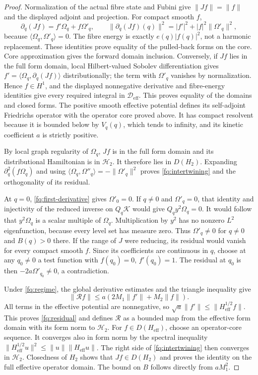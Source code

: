 \begin{proof}
Normalization of the actual fibre state and Fubini give
$\|Jf\|=\|f\|$ and the displayed adjoint and projection.
For compact smooth $f$,
\[
 \partial_q(Jf)=f'\Omega_q+f\Omega'_q,\qquad
 \|\partial_q(Jf)(q)\|^2=|f'|^2+|f|^2\|\Omega'_q\|^2,
\]
because $\langle\Omega_q,\Omega'_q\rangle=0$. The fibre energy
is exactly $e(q)|f(q)|^2$, not a harmonic replacement. These
identities prove equality of the pulled-back forms on the core.
Core approximation gives the forward domain inclusion. Conversely,
if $Jf$ lies in the full form domain, local Hilbert-valued Sobolev
differentiation gives
$f'=\langle\Omega_q,\partial_q(Jf)\rangle$ distributionally;
the term with $\Omega'_q$ vanishes by normalization. Hence $f\in H^1$,
and the displayed nonnegative derivative and fibre-energy identities
give every required integral in $\mathcal D_{\mathrm{eff}}$.
This proves equality of the domains and closed forms. The positive
smooth effective potential defines its self-adjoint Friedrichs
operator with the operator core proved above. It has compact
resolvent because it is bounded below by $V_q(q)$, which tends
to infinity, and its kinetic coefficient $a$ is strictly positive.

By local graph regularity of $\Omega_q$, $Jf$ is in the full form
domain and its distributional Hamiltonian is in $\mathscr H_2$.
It therefore lies in $D(H_2)$. Expanding $\partial_q^2(f\Omega_q)$
and using $\langle\Omega_q,\Omega''_q\rangle=-\|\Omega'_q\|^2$
proves \eqref{fq:intertwining} and the orthogonality of its residual.

At $q=0$, \eqref{fq:first-derivative} gives $\Omega'_0=0$.
If $q\ne0$ and $\Omega'_q=0$, that identity and injectivity of
the reduced inverse on $Q_q\mathscr K$ would give
$Q_qy^2\Omega_q=0$. It would follow that $y^2\Omega_q$ is a
scalar multiple of $\Omega_q$. Multiplication by $y^2$ has no
nonzero $L^2$ eigenfunction, because every level set has measure
zero. Thus $\Omega'_q\ne0$ for $q\ne0$ and $B(q)>0$ there.
If the range of $J$ were reducing, its residual would vanish for
every compact smooth $f$. Since its coefficients are continuous
in $q$, choose at any $q_0\ne0$ a test function with
$f(q_0)=0$, $f'(q_0)=1$. The residual at $q_0$ is then
$-2a\Omega'_{q_0}\ne0$, a contradiction.

Under \eqref{fq:regime}, the global derivative estimates and the
triangle inequality give
\[
 \|\mathcal Rf\|\leq a(2M_1\|f'\|+M_2\|f\|).
\]
All terms in the effective potential are nonnegative, so
$\sqrt a\|f'\|\leq\|H_{\mathrm{eff}}^{1/2}f\|$.
This proves \eqref{fq:residual} and defines $\mathcal R$ as a
bounded map from the effective form domain with its form norm
to $\mathscr H_2$. For $f\in D(H_{\mathrm{eff}})$, choose an
operator-core sequence. It converges also in form norm by the
spectral inequality
$\|H_{\mathrm{eff}}^{1/2}u\|^2\leq\|u\|\|H_{\mathrm{eff}}u\|$.
The right side of \eqref{fq:intertwining} then converges in
$\mathscr H_2$. Closedness of $H_2$ shows that
$Jf\in D(H_2)$ and proves the identity on the full effective
operator domain. The bound on $B$ follows directly from $aM_1^2$.
\end{proof}

